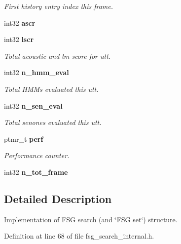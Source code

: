 \begin{DoxyCompactItemize}
\begin{DoxyCompactList}\small\item\em First history entry index this frame. \end{DoxyCompactList}\item 
int32 {\bfseries ascr}\label{structfsg__search__s_aac3c130a5777edd2a227fd064eaefbf2}

\item 
int32 {\bf lscr}\label{structfsg__search__s_a709277a80e9418ecc3e63296f8eb6bbf}

\begin{DoxyCompactList}\small\item\em Total acoustic and lm score for utt. \end{DoxyCompactList}\item 
int32 {\bf n\-\_\-hmm\-\_\-eval}\label{structfsg__search__s_a7e3d7375b4a33af339e8b55885677faa}

\begin{DoxyCompactList}\small\item\em Total H\-M\-Ms evaluated this utt. \end{DoxyCompactList}\item 
int32 {\bf n\-\_\-sen\-\_\-eval}\label{structfsg__search__s_a56494e3b30d0c66367c7ef055b8addb2}

\begin{DoxyCompactList}\small\item\em Total senones evaluated this utt. \end{DoxyCompactList}\item 
ptmr\-\_\-t {\bf perf}\label{structfsg__search__s_add677e47865b37fb38068a78abc7b2c4}

\begin{DoxyCompactList}\small\item\em Performance counter. \end{DoxyCompactList}\item 
int32 {\bfseries n\-\_\-tot\-\_\-frame}\label{structfsg__search__s_aaaabef8be74b09945e28864c6040f0ff}

\end{DoxyCompactItemize}


\subsection{Detailed Description}
Implementation of F\-S\-G search (and \char`\"{}\-F\-S\-G set\char`\"{}) structure. 

Definition at line 68 of file fsg\-\_\-search\-\_\-internal.\-h.



